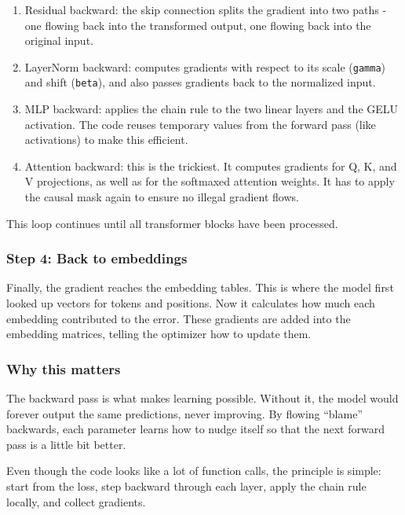 \documentclass[
  letterpaper,
  DIV=11,
  numbers=noendperiod]{scrreprt}
\providecommand{\tightlist}{%
  \setlength{\itemsep}{0pt}\setlength{\parskip}{0pt}}
\begin{document}
\begin{enumerate}
\def\labelenumi{\arabic{enumi}.}
\tightlist
\item
  Residual backward: the skip connection splits the gradient into two
  paths - one flowing back into the transformed output, one flowing back
  into the original input.
\item
  LayerNorm backward: computes gradients with respect to its scale
  (\texttt{gamma}) and shift (\texttt{beta}), and also passes gradients
  back to the normalized input.
\item
  MLP backward: applies the chain rule to the two linear layers and the
  GELU activation. The code reuses temporary values from the forward
  pass (like activations) to make this efficient.
\item
  Attention backward: this is the trickiest. It computes gradients for
  Q, K, and V projections, as well as for the softmaxed attention
  weights. It has to apply the causal mask again to ensure no illegal
  gradient flows.
\end{enumerate}

This loop continues until all transformer blocks have been processed.

\subsubsection{Step 4: Back to
embeddings}\label{step-4-back-to-embeddings}

Finally, the gradient reaches the embedding tables. This is where the
model first looked up vectors for tokens and positions. Now it
calculates how much each embedding contributed to the error. These
gradients are added into the embedding matrices, telling the optimizer
how to update them.

\subsubsection{Why this matters}\label{why-this-matters-3}

The backward pass is what makes learning possible. Without it, the model
would forever output the same predictions, never improving. By flowing
``blame'' backwards, each parameter learns how to nudge itself so that
the next forward pass is a little bit better.

Even though the code looks like a lot of function calls, the principle
is simple: start from the loss, step backward through each layer, apply
the chain rule locally, and collect gradients.
\end{document}
